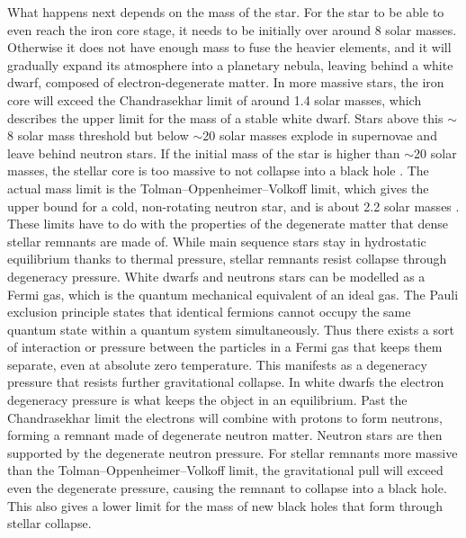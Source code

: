 \documentclass[english, oneside]{HYgradu}
\begin{document}
What happens next depends on the mass of the star. For the star to be able to even reach the iron core stage, it needs to be initially over around 8 solar masses. Otherwise it does not have enough mass to fuse the heavier elements, and it will gradually expand its atmosphere into a planetary nebula, leaving behind a white dwarf, composed of electron-degenerate matter. In more massive stars, the iron core will exceed the Chandrasekhar limit of around 1.4 solar masses, which describes the upper limit for the mass of a stable white dwarf. Stars above this $\sim$8 solar mass threshold but below $\sim$20 solar masses explode in supernovae and leave behind neutron stars. If the initial mass of the star is higher than $\sim$20 solar masses, the stellar core is too massive to not collapse into a black hole \citep{woosley:2002}. The actual mass limit is the Tolman–Oppenheimer–Volkoff limit, which gives the upper bound for a cold, non-rotating neutron star, and is about 2.2 solar masses \citep{margalit:2017}. These limits have to do with the properties of the degenerate matter that dense stellar remnants are made of. While main sequence stars stay in hydrostatic equilibrium thanks to thermal pressure, stellar remnants resist collapse through degeneracy pressure. White dwarfs and neutrons stars can be modelled as a Fermi gas, which is the quantum mechanical equivalent of an ideal gas. The Pauli exclusion principle states that identical fermions cannot occupy the same quantum state within a quantum system simultaneously. Thus there exists a sort of interaction or pressure between the particles in a Fermi gas that keeps them separate, even at absolute zero temperature. This manifests as a degeneracy pressure that resists further gravitational collapse. In white dwarfs the electron degeneracy pressure is what keeps the object in an equilibrium. Past the Chandrasekhar limit the electrons will combine with protons to form neutrons, forming a remnant made of degenerate neutron matter. Neutron stars are then supported by the degenerate neutron pressure. For stellar remnants more massive than the Tolman–Oppenheimer–Volkoff limit, the gravitational pull will exceed even the degenerate pressure, causing the remnant to collapse into a black hole. This also gives a lower limit for the mass of new black holes that form through stellar collapse.
\end{document}
